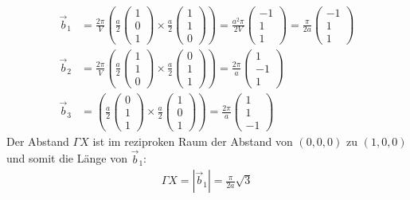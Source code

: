 \begin{align*}
\vec{b}_1 &= \frac{2\pi}{V}\left(\frac{a}{2}\begin{pmatrix}1\\0\\1\end{pmatrix}\times\frac{a}{2}\begin{pmatrix}1\\1\\0\end{pmatrix}\right) = \frac{a^2\pi}{2V}\begin{pmatrix}-1\\1\\1\end{pmatrix} = \frac{\pi}{2a}\begin{pmatrix}-1\\1\\1\end{pmatrix} \\
\vec{b}_2 &= \frac{2\pi}{V}\left(\frac{a}{2}\begin{pmatrix}1\\1\\0\end{pmatrix}\times\frac{a}{2}\begin{pmatrix}0\\1\\1\end{pmatrix}\right) = \frac{2\pi}{a}\begin{pmatrix}1\\-1\\1\end{pmatrix}\\
\vec{b}_3 &= \left(\frac{a}{2}\begin{pmatrix}0\\1\\1\end{pmatrix}\times\frac{a}{2}\begin{pmatrix}1\\0\\1\end{pmatrix}\right) = \frac{2\pi}{a}\begin{pmatrix}1\\1\\-1\end{pmatrix}
\end{align*}
Der Abstand $\Gamma X$ ist im reziproken Raum der Abstand von $(0,0,0)$ zu $(1,0,0)$ und somit die Länge von $\vec{b}_1$:
\begin{align*}
\Gamma X = |\vec{b}_1| = \frac{\pi}{2a}\sqrt{3}
\end{align*}

